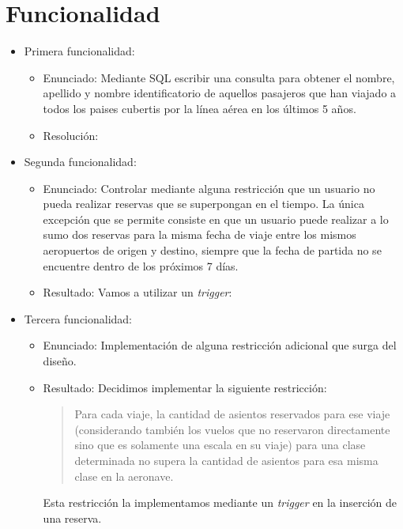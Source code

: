 \section{Funcionalidad}

\begin{itemize}
	\item Primera funcionalidad:
		\begin{itemize}
			\item Enunciado: Mediante SQL escribir una consulta para obtener el nombre, apellido y nombre
			identificatorio de aquellos pasajeros que han viajado a todos los paises cubertis por la l\'inea
			a\'erea en los \'ultimos 5 a\~nos.

			\item Resoluci\'on:

			
		\end{itemize}
	\item Segunda funcionalidad:
		\begin{itemize}
			\item Enunciado: Controlar mediante alguna restricci\'on que un usuario no pueda realizar
			reservas que se superpongan en el tiempo. La \'unica excepci\'on que se permite consiste en
			que un usuario puede realizar a lo sumo dos reservas para la misma fecha de viaje entre los
			mismos aeropuertos de origen y destino, siempre que la fecha de partida no se encuentre dentro
			de los pr\'oximos 7 d\'ias.
			\item Resultado: Vamos a utilizar un \textit{trigger}:

			
		\end{itemize}
	\item Tercera funcionalidad:
		\begin{itemize}
			\item Enunciado: Implementaci\'on de alguna restricci\'on adicional que surga del dise\~no.			
			\item Resultado: Decidimos implementar la siguiente restricci\'on:

			\begin{quotation}
				Para cada viaje, la cantidad de asientos reservados para ese viaje (considerando tambi\'en los vuelos
				que no reservaron directamente sino que es solamente una escala en su viaje) para una clase determinada 
				no supera la cantidad de asientos para esa misma clase en la aeronave.
			\end{quotation}

			Esta restricci\'on la implementamos mediante un \textit{trigger} en la inserci\'on de una reserva. 
			
			
		\end{itemize}
\end{itemize}

